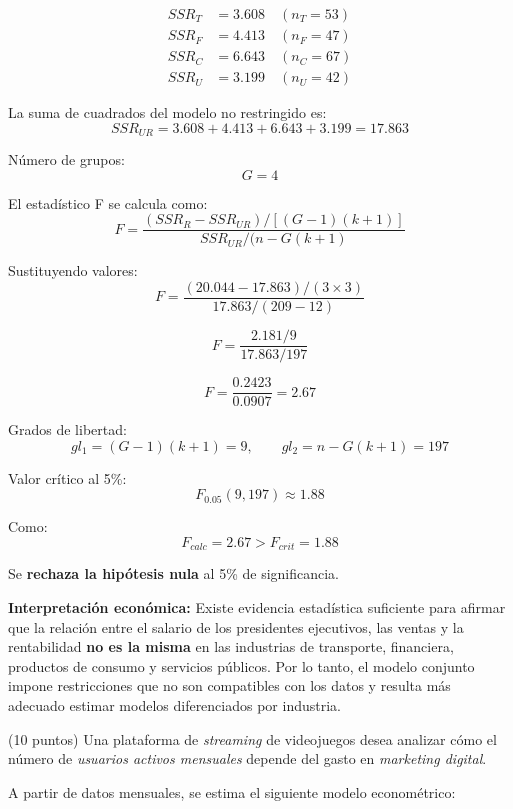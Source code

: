 \documentclass[10pt,a4paper]{article}
\begin{document}
\begin{enumerate}
\[
\begin{aligned}
SSR_T &= 3.608 \quad (n_T = 53) \\
SSR_F &= 4.413 \quad (n_F = 47) \\
SSR_C &= 6.643 \quad (n_C = 67) \\
SSR_U &= 3.199 \quad (n_U = 42)
\end{aligned}
\]

La suma de cuadrados del modelo no restringido es:
\[
SSR_{UR} = 3.608 + 4.413 + 6.643 + 3.199 = 17.863
\]

Número de grupos:
\[
G = 4
\]


El estadístico F se calcula como:
\[
F = \frac{(SSR_R - SSR_{UR}) / [(G-1)(k+1)]}{SSR_{UR} / (n - G(k+1)}
\]

Sustituyendo valores:
\[
F = \frac{(20.044 - 17.863) / (3 \times 3)}{17.863 / (209 - 12)}
\]

\[
F = \frac{2.181 / 9}{17.863 / 197}
\]

\[
F = \frac{0.2423}{0.0907} = 2.67
\]


Grados de libertad:
\[
gl_1 = (G-1)(k+1) = 9, \qquad gl_2 = n - G(k+1) = 197
\]

Valor crítico al 5\%:
\[
F_{0.05}(9,197) \approx 1.88
\]

Como:
\[
F_{calc} = 2.67 > F_{crit} = 1.88
\]


Se \textbf{rechaza la hipótesis nula} al 5\% de significancia.

\medskip

\textbf{Interpretación económica:}  
Existe evidencia estadística suficiente para afirmar que la relación entre el salario de los
presidentes ejecutivos, las ventas y la rentabilidad \textbf{no es la misma} en las industrias de
transporte, financiera, productos de consumo y servicios públicos.
Por lo tanto, el modelo conjunto impone restricciones que no son compatibles con los datos y
resulta más adecuado estimar modelos diferenciados por industria.


 
\end{enumerate}



\newpage
\item (10 puntos) Una plataforma de \textit{streaming} de videojuegos desea analizar cómo el número de
\textit{usuarios activos mensuales} depende del gasto en \textit{marketing digital}.

A partir de datos mensuales, se estima el siguiente modelo econométrico:
\end{document}
